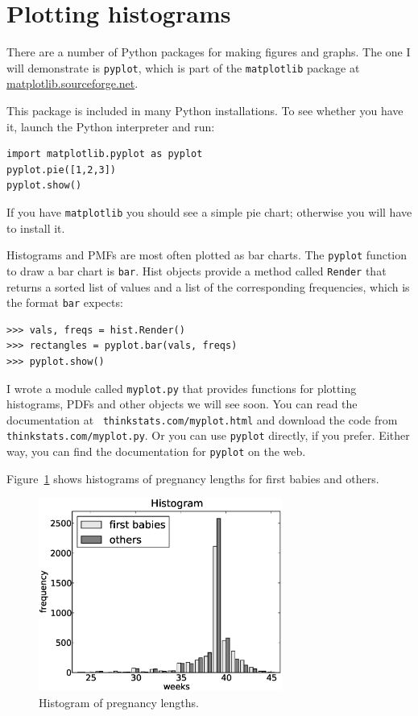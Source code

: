 \documentclass[12pt]{book}
\begin{document}
\section{Plotting histograms}


There are a number of Python packages for making figures and graphs.
The one I will demonstrate is {\tt pyplot}, which is part of
the {\tt matplotlib} package at \url{matplotlib.sourceforge.net}.

This package is included in many Python installations.  To see whether
you have it, launch the Python interpreter and run:

\begin{verbatim}
import matplotlib.pyplot as pyplot
pyplot.pie([1,2,3])
pyplot.show()
\end{verbatim}

If you have {\tt matplotlib} you should see a simple pie chart;
otherwise you will have to install it.


Histograms and PMFs are most often plotted as bar charts.  The
{\tt pyplot} function to draw a bar chart is {\tt bar}.  Hist
objects provide a method called {\tt Render} that returns a sorted
list of values and a list of the corresponding frequencies, which
is the format {\tt bar} expects:

\begin{verbatim}
>>> vals, freqs = hist.Render()
>>> rectangles = pyplot.bar(vals, freqs)
>>> pyplot.show()
\end{verbatim}

I wrote a module called {\tt myplot.py} that provides functions
for plotting histograms, PDFs and other objects we will see soon.
You can read the documentation at {\tt
  thinkstats.com/myplot.html} and download the code from {\tt
  thinkstats.com/myplot.py}.  Or you can use
{\tt pyplot} directly, if you prefer.  Either way, you can find
the documentation for {\tt pyplot} on the web.


Figure~\ref{nsfg_hist} shows histograms of pregnancy lengths for
first babies and others.


\begin{figure}
\centerline{\includegraphics[height=2.5in]{figs/nsfg_hist.eps}}
\caption{Histogram of pregnancy lengths.}
\label{nsfg_hist}
\end{figure}
\end{document}
